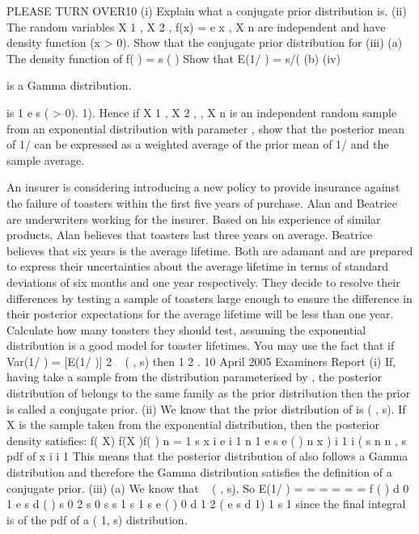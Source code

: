 \documentclass[a4paper,12pt]{article}
\begin{document}
\begin{enumerate}

PLEASE TURN OVER10
(i) Explain what a conjugate prior distribution is.
(ii) The random variables X 1 , X 2 ,
f(x) = e
x
, X n are independent and have density function
(x > 0).
Show that the conjugate prior distribution for
(iii)
(a)
The density function of
f( ) =
s
( )
Show that E(1/ ) = s/(
(b)
(iv)

is a Gamma distribution.

is
1
e
s
( > 0).
1).
Hence if X 1 , X 2 , , X n is an independent random sample from an exponential distribution with parameter , show that the posterior
mean of 1/ can be expressed as a weighted average of the prior mean of 1/ and the sample average.

An insurer is considering introducing a new policy to provide insurance
against the failure of toasters within the first five years of purchase. Alan and Beatrice are underwriters working for the insurer. Based on his experience of
similar products, Alan believes that toasters last three years on average. Beatrice believes that six years is the average lifetime. Both are adamant and
are prepared to express their uncertainties about the average lifetime in terms of standard deviations of six months and one year respectively. They decide
to resolve their differences by testing a sample of toasters large enough to ensure the difference in their posterior expectations for the average lifetime
will be less than one year.
Calculate how many toasters they should test, assuming the exponential distribution is a good model for toaster lifetimes.
You may use the fact that if
Var(1/ ) = [E(1/ )] 2
~ ( , s) then
1
2
.
10
April 2005
Examiners Report
(i) If, having take a sample from the distribution parameterised by , the posterior distribution of belongs to the same family as the prior distribution then the
prior is called a conjugate prior.
(ii) We know that the prior distribution of is ( , s). If X is the sample taken from the exponential distribution, then the posterior density satisfies:
f( X)
f(X )f( )
n
=
1
s
x i
e
i 1
n 1
e
s
e
( )
n
x )
i 1 i
( s
n
n , s
pdf of
x i
i 1
This means that the posterior distribution of also follows a Gamma
distribution and therefore the Gamma distribution satisfies the definition of a
conjugate prior.
(iii)
(a)
We know that
~ ( , s). So
E(1/ ) =
=
=
=
=
=
f ( )
d
0
1
e s
d
( )
s
0
2
s
0
s
s
1
s
1
s
e
( )
0
d
1
2
(
e s
d
1)
1
s
1
since the final integral is of the pdf of a (
1, s) distribution.


\end{enumerate}
\end{document}
